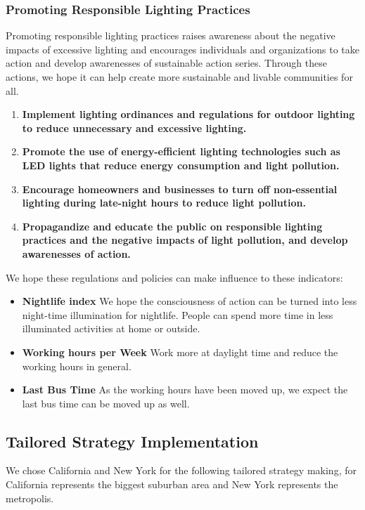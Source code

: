 \subsubsection{Promoting Responsible Lighting Practices}
Promoting responsible lighting practices raises awareness about the negative impacts of excessive lighting and encourages individuals and organizations to take action and develop awarenesses of sustainable action series. Through these actions, we hope it can help create more sustainable and livable communities for all.
\begin{enumerate}
    \item \textbf{Implement lighting ordinances and regulations for outdoor lighting to reduce unnecessary and excessive lighting.}
    
    \item \textbf{Promote the use of energy-efficient lighting technologies such as LED lights that reduce energy consumption and light pollution.}
    
    \item \textbf{Encourage homeowners and businesses to turn off non-essential lighting during late-night hours to reduce light pollution.}
    
    \item \textbf{Propagandize and educate the public on responsible lighting practices and the negative impacts of light pollution, and develop awarenesses of action.}
\end{enumerate}

We hope these regulations and policies can make influence to these indicators:
\begin{itemize}
    \item \textbf{Nightlife index} We hope the consciousness of action can be turned into less night-time illumination for nightlife. People can spend more time in less illuminated activities at home or outside.
    \item \textbf{Working hours per Week} Work more at daylight time and reduce the working hours in general.
    \item \textbf{Last Bus Time} As the working hours have been moved up, we expect the last bus time can be moved up as well.
\end{itemize}





\subsection{Tailored Strategy Implementation}
We chose California and New York for the following tailored strategy making, for California represents the biggest suburban area and New York represents the metropolis. 
